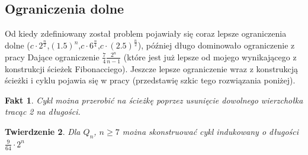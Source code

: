 \documentclass{pracamgr}
\newtheorem{theorem}{Twierdzenie}[chapter]
\newtheorem{fact}[theorem]{Fakt}
\begin{document}
    \subsection{Ograniczenia dolne}
     Od kiedy zdefiniowany został problem pojawiały się coraz lepsze ograniczenia dolne
     ($c\cdot2^{\frac{n}{2}}$,$(1.5)^{n}$,$c\cdot6^{\frac{n}{4}}$,$c\cdot(2.5)^{\frac{n}{2}}$), później długo dominowało ograniczenie z pracy \cite{Snake1}
     Dające ograniczenie $\frac{7}{4}\frac{2^n}{n-1}$ (które jest już lepsze od mojego wynikającego z konstrukcji ścieżek Fibonacciego).\newline
     Jeszcze lepsze ograniczenie wraz z konstrukcją ścieżki i cyklu pojawia się w pracy \cite{Snake2} (przedstawię szkic tego rozwiązania poniżej).
     \begin{fact}
      Cykl można przerobić na ścieżkę poprzez usunięcie dowolnego wierzchołka tracąc 2 na długości.
     \end{fact}
     \begin{theorem}\label{snake 9/64 2^n}
      Dla $Q_n$, $n\ge7$ można skonstruować cykl indukowany o długości $\frac{9}{64}\cdot2^n$
     \end{theorem}
\end{document}
